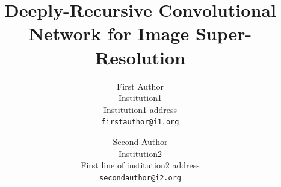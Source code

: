 \documentclass[10pt,twocolumn,letterpaper]{article}
\begin{document}


\title{Deeply-Recursive Convolutional Network for Image Super-Resolution}

\author{First Author\\
	Institution1\\
	Institution1 address\\
	{\tt\small firstauthor@i1.org}
	\and
	Second Author\\
	Institution2\\
	First line of institution2 address\\
	{\tt\small secondauthor@i2.org}
}

\maketitle

\end{document}
